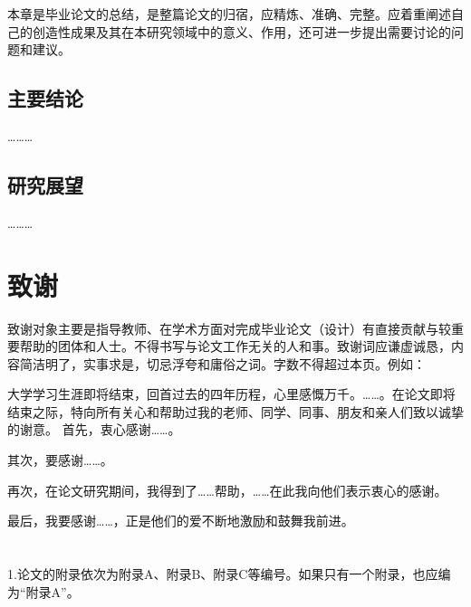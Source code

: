 \documentclass{QITthesis}
\begin{document}
本章是毕业论文的总结，是整篇论文的归宿，应精炼、准确、完整。应着重阐述自己的创造性成果及其在本研究领域中的意义、作用，还可进一步提出需要讨论的问题和建议。

\subsection{主要结论}

\dots\dots\dots

\subsection{研究展望}

\dots\dots\dots


\nocite{*}
\printbibliography
{}

\section{致\hspace{.5\ccwd}谢}

致谢对象主要是指导教师、在学术方面对完成毕业论文（设计）有直接贡献与较重要帮助的团体和人士。不得书写与论文工作无关的人和事。致谢词应谦虚诚恳，内容简洁明了，实事求是，切忌浮夸和庸俗之词。字数不得超过本页。例如：

大学学习生涯即将结束，回首过去的四年历程，心里感慨万千。\dots\dots。在论文即将结束之际，特向所有关心和帮助过我的老师、同学、同事、朋友和亲人们致以诚挚的谢意。
首先，衷心感谢\dots\dots。

其次，要感谢\dots\dots。

再次，在论文研究期间，我得到了\dots\dots 帮助，\dots\dots 在此我向他们表示衷心的感谢。

最后，我要感谢\dots\dots，正是他们的爱不断地激励和鼓舞我前进。

\appendix
\setcounter{figure}{0}
\setcounter{table}{0}
\setcounter{equation}{0}

\section{}

1.论文的附录依次为附录A、附录B、附录C等编号。如果只有一个附录，也应编为“附录A”。
\end{document}
